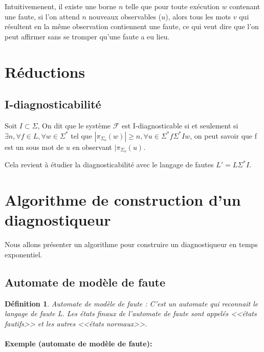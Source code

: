 \documentclass[10pt,a4paper]{article}
\newtheorem{mydef}{D\'efinition}
\begin{document}
Intuitivemenent, il existe une borne $n$ telle que pour toute ex\'ecution $w$ contenant une faute, si l'on attend $n$ nouveaux observables ($u$), alors tous les mots $v$ qui r\'esultent en la m\^eme observation contiennent une faute, ce qui veut dire que l'on peut affirmer sans se tromper qu'une faute a eu lieu.

\section{R\'eductions}

\subsection{I-diagnosticabilit\'e}


Soit $I \subset \Sigma$, On dit que le système $\mathcal F$ est I-diagnosticable si et seulement si $\exists n, \forall  f \in L, \forall w \in \Sigma^*$ tel que $|\pi_{\Sigma_o}(w)| \geq n, \forall u \in \Sigma^*f \Sigma^* I w$, on peut savoir que f est un sous mot de $u$ en observant $|\pi_{\Sigma_o}(u)$. 


Cela revient à étudier la diagnosticabilité avec le langage de fautes $L'=L \Sigma^* I$.



\section{Algorithme de construction d'un diagnostiqueur}
    Nous allons présenter un algorithme pour construire un diagnostiqueur en temps exponentiel. ~\cite{SamSRST96}
        \subsection{Automate de mod\`ele de faute}
   \begin{mydef}{Automate de mod\`ele de faute : }
C'est un automate qui reconnait le langage de faute L. Les états finaux de l'automate de faute sont appelés <<\'etats fautifs>> et les autres <<\'etats normaux>>.
 \end{mydef}
    
    \paragraph{Exemple (automate de mod\`ele de faute): } %
    
\end{document}

